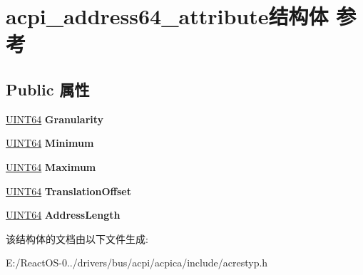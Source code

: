 \hypertarget{structacpi__address64__attribute}{}\section{acpi\+\_\+address64\+\_\+attribute结构体 参考}
\label{structacpi__address64__attribute}
\subsection*{Public 属性}
\begin{DoxyCompactItemize}
\item 
\mbox{\label{structacpi__address64__attribute_a2672354f6e10e6a9c6e2dd24bc92bd24}} 
\hyperlink{_processor_bind_8h_a57be03562867144161c1bfee95ca8f7c}{U\+I\+N\+T64} {\bfseries Granularity}
\item 
\mbox{\label{structacpi__address64__attribute_a6490a2f53f1dd0f3c176f4c4e1772bea}} 
\hyperlink{_processor_bind_8h_a57be03562867144161c1bfee95ca8f7c}{U\+I\+N\+T64} {\bfseries Minimum}
\item 
\mbox{\label{structacpi__address64__attribute_a7ed21fd44bb296c8ab77c9ea2c2c987e}} 
\hyperlink{_processor_bind_8h_a57be03562867144161c1bfee95ca8f7c}{U\+I\+N\+T64} {\bfseries Maximum}
\item 
\mbox{\label{structacpi__address64__attribute_a4cb9eeb11995ec79cdd2da4d3a74a3d6}} 
\hyperlink{_processor_bind_8h_a57be03562867144161c1bfee95ca8f7c}{U\+I\+N\+T64} {\bfseries Translation\+Offset}
\item 
\mbox{\label{structacpi__address64__attribute_ab208c3e5f6a7e1dd740ce960c605b2c9}} 
\hyperlink{_processor_bind_8h_a57be03562867144161c1bfee95ca8f7c}{U\+I\+N\+T64} {\bfseries Address\+Length}
\end{DoxyCompactItemize}


该结构体的文档由以下文件生成\+:\begin{DoxyCompactItemize}
\item 
E\+:/\+React\+O\+S-\/0../drivers/bus/acpi/acpica/include/acrestyp.\+h\end{DoxyCompactItemize}
